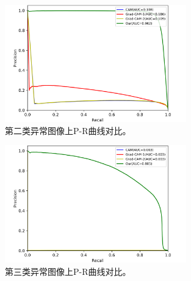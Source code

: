 \begin{figure}[H]
	\centering
	\includegraphics[width=0.7\textwidth]{figure/pr_curve_multi_skin/SKIN_pr_curve.png}
	\caption[第二类异常图像上P-R曲线对比]{第二类异常图像上P-R曲线对比。} 
	\label{fig:multi_simulate_pr_curve_skin}
\end{figure}
\begin{figure}[H]
	\centering
	\includegraphics[width=0.7\textwidth]{figure/pr_curve_multi_skin/CIRCLE_pr_curve.png}
	\caption[第三类异常图像上P-R曲线对比]{第三类异常图像上P-R曲线对比。}
	\label{fig:multi_simulate_pr_curve_circle}
\end{figure}

